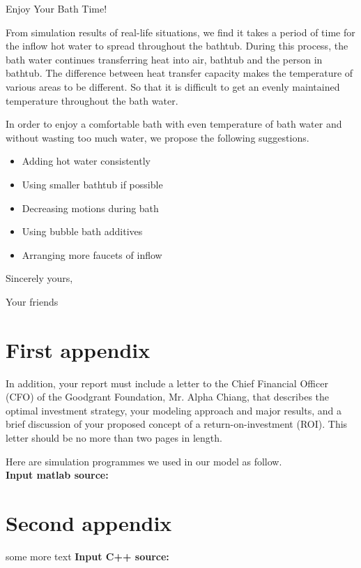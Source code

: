 \documentclass{mcmthesis}
\begin{document}


\newpage

\begin{letter}{Enjoy Your Bath Time!}

From simulation results of real-life situations, we find it takes a period of time for the inflow hot water to spread throughout the bathtub. During this process, the bath water continues transferring heat into air, bathtub and the person in bathtub. The difference between heat transfer capacity makes the temperature of various areas to be different. So that it is difficult to get an evenly maintained temperature throughout the bath water.

In order to enjoy a comfortable bath with even temperature of bath water and without wasting too much water, we propose the following suggestions.

\begin{itemize}[leftmargin=*]
\item Adding hot water consistently
\item Using smaller bathtub if possible
\item Decreasing motions during bath
\item Using bubble bath additives
\item Arranging more faucets of inflow
\end{itemize}

\vspace{\parskip}

Sincerely yours,

Your friends

\end{letter}

\newpage

\begin{appendices}

\section{First appendix}

In addition, your report must include a letter to the Chief Financial Officer (CFO) of the Goodgrant Foundation, Mr. Alpha Chiang, that describes the optimal investment strategy, your modeling approach and major results, and a brief discussion of your proposed concept of a return-on-investment (ROI). This letter should be no more than two pages in length.

Here are simulation programmes we used in our model as follow.\\

\textbf{\textcolor[rgb]{0.98,0.00,0.00}{Input matlab source:}}


\section{Second appendix}

some more text \textcolor[rgb]{0.98,0.00,0.00}{\textbf{Input C++ source:}}


\end{appendices}
\end{document}

